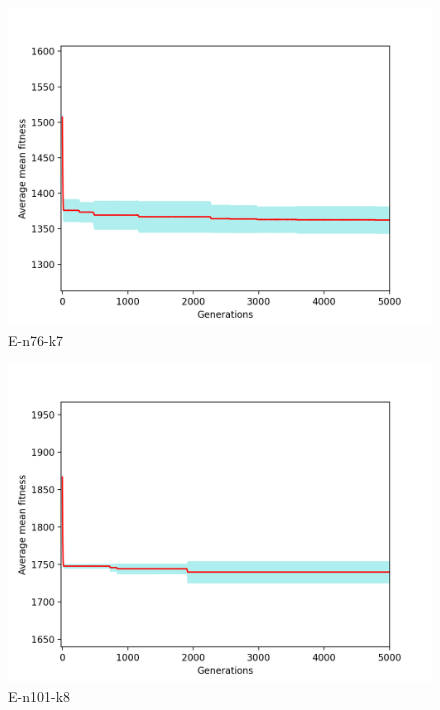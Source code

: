 \documentclass[conference,compsoc]{IEEEtran}
\begin{document}
\begin{figure}[h!]
    \centering
    \includegraphics[scale=0.35]{E-n76-k7-mean}
    \caption{E-n76-k7}
    \label{fig:my_label}
\end{figure}


\begin{figure}[h!]
    \centering
    \includegraphics[scale=0.35]{E-n101-k8-mean}
    \caption{E-n101-k8}
    \label{fig:my_label}
\end{figure}
\end{document}
